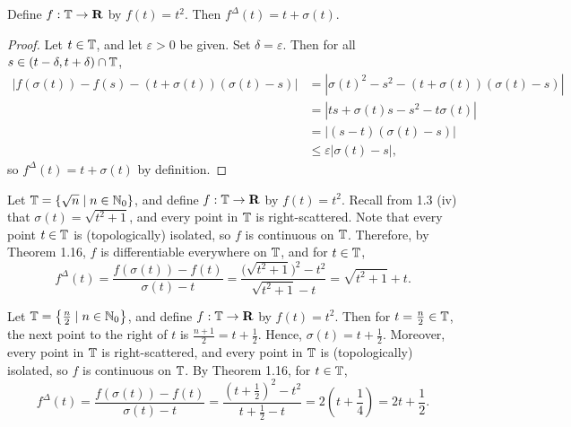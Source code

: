 \documentclass{homework}
\begin{document}
	
	Define $f : \mathbb{T} \to \textnormal{\bf R}$ by $f(t) = t^2$. Then $f^\Delta(t) = t + \sigma(t)$.
	
	\begin{proof}
		Let $t \in \mathbb{T}$, and let $\varepsilon > 0$ be given. Set $\delta = \varepsilon$. Then for all $s \in (t-\delta, t+\delta) \cap \mathbb{T}$,
		\begin{align*}
			|f(\sigma(t)) - f(s) - (t+\sigma(t))(\sigma(t) - s)| &= |\sigma(t)^2 - s^2 - (t+\sigma(t))(\sigma(t)-s)| \\
			&= |ts + \sigma(t)s - s^2-t\sigma(t)| \\
			&= |(s-t)(\sigma(t) - s)| \\
			&\le \varepsilon|\sigma(t)-s|,
		\end{align*}
		so $f^\Delta(t) = t + \sigma(t)$ by definition.
	\end{proof}
	
	Let $\mathbb{T} = \{\sqrt{n} \mid n \in \mathbb{N}_0\}$, and define $f : \mathbb{T} \to \textnormal{\bf R}$ by $f(t) = t^2$. Recall from 1.3 (iv) that $\sigma(t) = \sqrt{t^2+1}$, and every point in $\mathbb{T}$ is right-scattered. Note that every point $t \in \mathbb{T}$ is (topologically) isolated, so $f$ is continuous on $\mathbb{T}$. Therefore, by Theorem 1.16, $f$ is differentiable everywhere on $\mathbb{T}$, and for $t \in \mathbb{T}$,
	\begin{equation*}
		f^\Delta(t) = \frac{f(\sigma(t)) - f(t)}{\sigma(t) - t} = \frac{\big(\sqrt{t^2+1}\big)^2 - t^2}{\sqrt{t^2+1} - t} = \sqrt{t^2+1} + t.
	\end{equation*}
	
	Let $\mathbb{T} = \left\{\frac{n}{2} \mid n \in \mathbb{N}_0\right\}$, and define $f:\mathbb{T} \to\textnormal{\bf R}$ by $f(t) = t^2$. Then for $t = \frac{n}{2} \in \mathbb{T}$, the next point to the right of $t$ is $\frac{n+1}{2} = t + \frac{1}{2}$. Hence, $\sigma(t) = t + \frac{1}{2}$. Moreover, every point in $\mathbb{T}$ is right-scattered, and every point in $\mathbb{T}$ is (topologically) isolated, so $f$ is continuous on $\mathbb{T}$. By Theorem 1.16, for $t \in \mathbb{T}$,
	\begin{equation*}
		f^\Delta(t) = \frac{f(\sigma(t)) - f(t)}{\sigma(t) - t} = \frac{\left(t+\frac{1}{2}\right)^2 - t^2}{t+\frac{1}{2} - t} = 2\left(t+\frac{1}{4}\right) = 2t + \frac{1}{2}.
	\end{equation*}
	
\end{document}
